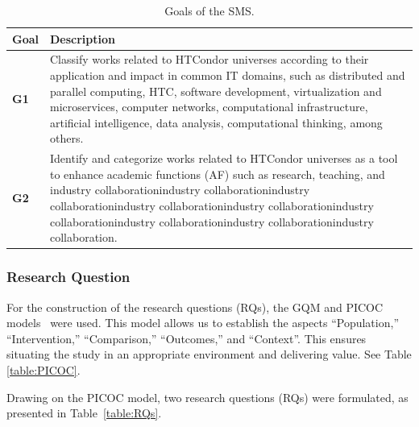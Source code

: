 \begin{table}[htbp]
	\centering
	\caption{Goals of the SMS.}
	\label{table:Goals}
	\renewcommand{\arraystretch}{1}  %
	\begin{tabular}{p{1cm}p{6.8cm}}
		\toprule
		\textbf{Goal} & \textbf{Description}                                                                                                                                                                                                                                                                                                                                 \\
		\midrule
		\textbf{G1}   & Classify works related to HTCondor universes according to their application and impact in common IT domains, such as distributed and parallel computing, HTC, software development, virtualization and microservices, computer networks, computational infrastructure, artificial intelligence, data analysis, computational thinking, among others. \\
		\addlinespace[0.8em]
		\textbf{G2}   & Identify and categorize works related to HTCondor universes as a tool to enhance academic functions (AF) such as research, teaching, and industry collaborationindustry collaborationindustry collaborationindustry collaborationindustry collaborationindustry collaborationindustry collaborationindustry collaborationindustry collaboration.     \\
		\bottomrule
	\end{tabular}
\end{table}


\subsubsection{Research Question}
For the construction of the research questions (RQs), the GQM and PICOC models~\cite{Needleman20026, Petticrew2008systematic} were used. This model allows us to establish the aspects ``Population,'' ``Intervention,'' ``Comparison,'' ``Outcomes,'' and ``Context''. This ensures situating the study in an appropriate environment and delivering value. See Table \ref{table:PICOC}.

Drawing on the PICOC model, two research questions (RQs) were formulated, as presented in Table~\ref{table:RQs}.

